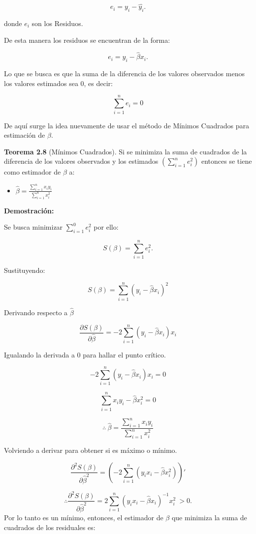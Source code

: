 \documentclass[
  a4paper,
  oneside,
  openany]{book}
\providecommand{\tightlist}{%
  \setlength{\itemsep}{0pt}\setlength{\parskip}{0pt}}
\begin{document}
\[e_{i}= y_{i}-\hat{y_{i}}.\]

donde \(e_{i}\) son los Residuos.

De esta manera los residuos se encuentran de la forma:

\[e_{i}=y_{i}-\hat{\beta}x_{i}.\]

Lo que se busca es que la suma de la diferencia de los valores observados menos los valores estimados sea 0, es decir:

\[\sum_{i=1}^{n}e_{i}=0\]

De aquí surge la idea nuevamente de usar el método de Mínimos Cuadrados para estimación de \(\beta.\)

\textbf{Teorema 2.8} (Mínimos Cuadrados).
Si se minimiza la suma de cuadrados de la diferencia de los valores observados y los estimados \(\left(\sum_{i=1}^{n}e_{i}^2\right)\) entonces se tiene como estimador de \(\beta\) a:

\begin{itemize}
\tightlist
\item
  \(\hat{\beta}=\frac{\sum_{i=1}^{n}x_{i}y_{i}}{\sum_{i=1}^{n}x_{i}^2}\)
\end{itemize}

\textbf{Demostración:}

Se busca minimizar \(\sum_{i=1}^{0}e_{i}^2\) por ello:

\[S(\beta)=\sum_{i=1}^{n}e_{i}^2.\]

Sustituyendo:

\[S(\beta)=\sum_{i=1}^{n}\left( y_{i}-\hat{\beta}x_{i}\right)^2\]

Derivando respecto a \(\hat{\beta}\)

\[\frac{\partial S(\beta)}{\partial \hat{\beta}}=-2\sum_{i=1}^{n}\left(y_{i}-\hat{\beta}x_{i}\right)x_{i}\]

Igualando la derivada a 0 para hallar el punto crítico.

\[-2\sum_{i=1}^{n}\left(y_{i}-\hat{\beta}x_{i}\right)x_{i}=0\]

\[\sum_{i=1}^{n}x_{i}y_{i}-\hat{\beta}x_{i}^2=0\]

\[\therefore \ \hat{\beta}=\frac{\sum_{i=1}^{n}x_{i}y_{i}}{\sum_{i=1}^{n}x_{i}^2}\]

Volviendo a derivar para obtener si es máximo o mínimo.

\[\frac{\partial^2 S(\beta)}{\partial \hat{\beta}^2}=\left(-2\sum_{i=1}^{n}\left(y_{i}x_{i}-\hat{\beta}x_{i}^2\right)\right)'\]

\[\therefore \frac{\partial^2 S(\beta)}{\partial \hat{\beta}^2}=2\sum_{i=1}^{n}\left(y_{i}x_{i}-\hat{\beta}x_{i}\right)^{-1}x_{i}^2 \ > 0.\]
Por lo tanto es un mínimo, entonces, el estimador de \(\beta\) que minimiza la suma de cuadrados de los residuales es:
\end{document}
